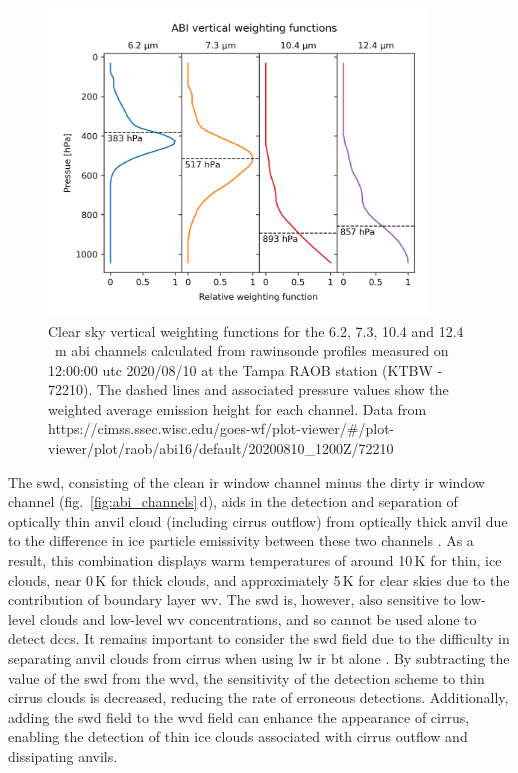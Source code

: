 \begin{figure}[tp]
    \includegraphics[width=0.9\textwidth]{figures/chapter1_04.png}
    \caption[
    Clear sky vertical weighting functions for the 6.2, 7.3, 10.4 and 12.4\,\unit{\mu m} \acrshort{abi} channels
    ]{
    Clear sky vertical weighting functions for the 6.2, 7.3, 10.4 and 12.4\,\unit{\mu m} \acrshort{abi} channels calculated from rawinsonde profiles measured on 12:00:00 \acrshort{utc} 2020/08/10 at the Tampa RAOB station (KTBW - 72210). The dashed lines and associated pressure values show the weighted average emission height for each channel. Data from {https://cimss.ssec.wisc.edu/goes-wf/plot-viewer/\#/plot-viewer/plot/raob/abi16/default/20200810\_1200Z/72210}
    }
    \label{fig:abi_vertical_weighting}
\end{figure}

The \acrfull{swd}, consisting of the clean \acrshort{ir} window channel minus the dirty \acrshort{ir} window channel (fig.~\ref{fig:abi_channels}\,d), aids in the detection and separation of optically thin anvil cloud (including cirrus outflow) from optically thick anvil due to the difference in ice particle emissivity between these two channels \citep{heidinger_gazing_2009}.
As a result, this combination displays warm temperatures of around 10\,\unit{K} for thin, ice clouds, near 0\,\unit{K} for thick clouds, and approximately 5\,\unit{K} for clear skies due to the contribution of boundary layer \acrshort{wv}.
The \acrshort{swd} is, however, also sensitive to low-level clouds and low-level \acrshort{wv} concentrations, and so cannot be used alone to detect \acrshort{dcc}s.
It remains important to consider the \acrshort{swd} field due to the difficulty in separating anvil clouds from cirrus when using \acrshort{lw} \acrshort{ir} \acrshort{bt} alone \citep{hong_detection_2005}. 
By subtracting the value of the \acrshort{swd} from the \acrshort{wvd}, the sensitivity of the detection scheme to thin cirrus clouds is decreased, reducing the rate of erroneous detections.
Additionally, adding the \acrshort{swd} field to the \acrshort{wvd} field can enhance the appearance of cirrus, enabling the detection of thin ice clouds associated with cirrus outflow and dissipating anvils.

